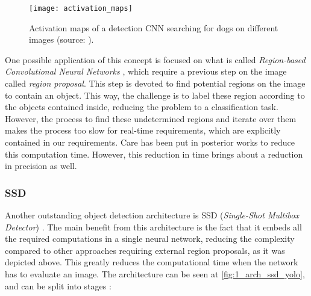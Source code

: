 \begin{figure}[h]
	\centering
	\texttt{[image: activation\_maps]}
	\caption{Activation maps of a detection CNN searching for dogs on different images (source: \cite{tfg}).}
	\label{fig:1_activation_maps}
\end{figure}


One possible application of this concept is focused on what is called \textit{Region-based Convolutional Neural Networks} \cite{rcnn}, which require a previous step on the image called \textit{region proposal}. This step is devoted to find potential regions on the image to contain an object. This way, the challenge is to label these region according to the objects contained inside, reducing the problem to a classification task. However, the process to find these undetermined regions and iterate over them makes the process too slow for real-time requirements, which are explicitly contained in our requirements. Care has been put in posterior works \cite{fastrcnn} \cite{spp} to reduce this computation time. However, this reduction in time brings about a reduction in precision as well.\\



\subsubsection{SSD}

Another outstanding object detection architecture is SSD (\textit{Single-Shot Multibox Detector}) \cite{ssd}. The main benefit from this architecture is the fact that it embeds all the required computations in a single neural network, reducing the complexity compared to other approaches requiring external region proposals, as it was depicted above. This greatly reduces the computational time when the network has to evaluate an image. The architecture can be seen at \autoref{fig:1_arch_ssd_yolo}, and can be split into stages \cite{tfg}:


